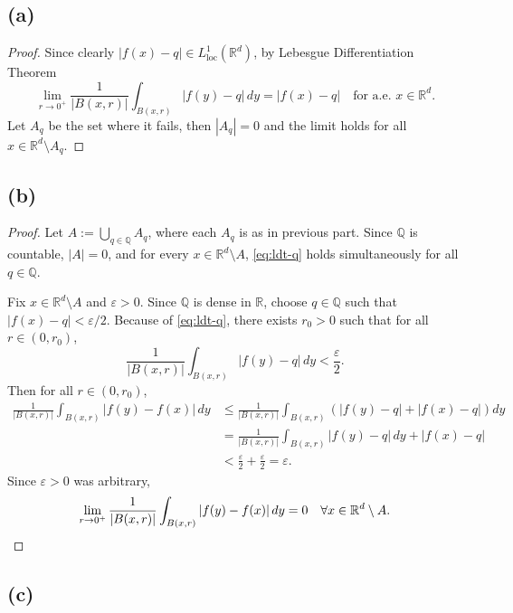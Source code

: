 \documentclass[12pt]{article}
\begin{document}
\subsection*{(a)}

\begin{proof}
Since clearly $|f(x)-q| \in L^1_{\mathrm{loc}}(\mathbb{R}^d)$, by Lebesgue Differentiation Theorem
\begin{equation}\label{eq:ldt-q}
  \lim_{r\to 0^+}\frac{1}{|B(x,r)|}\int_{B(x,r)}|f(y)-q|\,dy = |f(x)-q| \quad \text{for a.e. } x \in \mathbb{R}^d.
\end{equation}
Let $A_q$ be the set where it fails, then $|A_q| = 0$ and the limit holds for all $x \in \mathbb{R}^d \setminus A_q$.
\end{proof}

\subsection*{(b)}

\begin{proof}
Let $A := \bigcup_{q\in\mathbb{Q}} A_q$, where each $A_q$ is as in previous part.
Since $\mathbb{Q}$ is countable, $|A| = 0$, and for every $x \in \mathbb{R}^d \setminus A$,
\eqref{eq:ldt-q} holds simultaneously for all $q \in \mathbb{Q}$.

Fix $x \in \mathbb{R}^d \setminus A$ and $\varepsilon > 0$. Since $\mathbb{Q}$ is dense in $\mathbb{R}$, choose
$q \in \mathbb{Q}$ such that $|f(x)-q| < \varepsilon/2$. Because of \eqref{eq:ldt-q}, there exists $r_0 > 0$
such that for all $r \in (0, r_0)$,
\[
  \frac{1}{|B(x,r)|}\int_{B(x,r)}|f(y)-q|\,dy < \frac{\varepsilon}{2}.
\]
Then for all $r \in (0, r_0)$,
\begin{align*}
  \frac{1}{|B(x,r)|}\int_{B(x,r)}|f(y)-f(x)|\,dy
  &\leq \frac{1}{|B(x,r)|}\int_{B(x,r)}(|f(y)-q| + |f(x)-q|)dy \\
  &= \frac{1}{|B(x,r)|}\int_{B(x,r)}|f(y)-q|\,dy + |f(x)-q| \\
  &< \frac{\varepsilon}{2} + \frac{\varepsilon}{2} = \varepsilon.
\end{align*}
Since $\varepsilon > 0$ was arbitrary,
\begin{equation}\label{eq:ldt-b}
  \lim_{r\to 0^+}\frac{1}{|B(x,r)|}\int_{B(x,r)}|f(y)-f(x)|\,dy = 0 \quad \forall x \in \mathbb{R}^d \setminus A. \qedhere
\end{equation}
\end{proof}

\subsection*{(c)}
\end{document}
